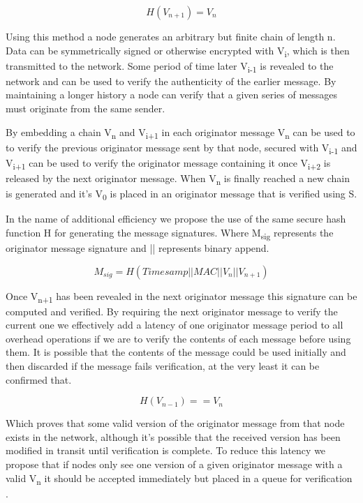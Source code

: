 \documentclass[11pt]{article}
\begin{document}
               \[H(V_{n+1}) = V_n\] 
               
               Using this method a node generates an arbitrary but finite chain of length n. Data can be symmetrically signed or otherwise encrypted with V\textsubscript{i}, which is then transmitted to the network. Some period of time later V\textsubscript{i-1} is revealed to the network and can be used to verify the authenticity of the earlier message. By maintaining a longer history a node can verify that a given series of messages must originate from the same sender.
               
               By embedding a chain V\textsubscript{n} and V\textsubscript{i+1} in each originator message V\textsubscript{n} can be used to to verify the previous originator message sent by that node, secured with V\textsubscript{i-1} and V\textsubscript{i+1} can be used to verify the originator message containing it once V\textsubscript{i+2} is released by the next originator message. When V\textsubscript{n} is finally reached a new chain is generated and it's V\textsubscript{0} is placed in an originator message that is verified using S.      
               
               
               In the name of additional efficiency we propose the use of the same secure hash function H for generating the message signatures. Where M\textsubscript{sig} represents the originator message signature and || represents binary append.
               
               \[M_{sig} = H(Timesamp||MAC||V_n||V_{n+1})\]
               
               Once V\textsubscript{n+1} has been revealed in the next originator message this signature can be computed and verified. By requiring the next originator message to verify the current one we effectively add a latency of one originator message period to all overhead operations if we are to verify the contents of each message before using them. It is possible that the contents of the message could be used initially and then discarded if the message fails verification, at the very least it can be confirmed that.
                     
                     \[H(V_{n-1}) == V_n\]
                     
               Which proves that some valid version of the originator message from that node exists in the network, although it's possible that the received version has been modified in transit until verification is complete. To reduce this latency we propose that if nodes only see one version of a given originator message with a valid V\textsubscript{n} it should be accepted immediately but placed in a queue for verification \cite{spins,hash}.
               
\end{document}
